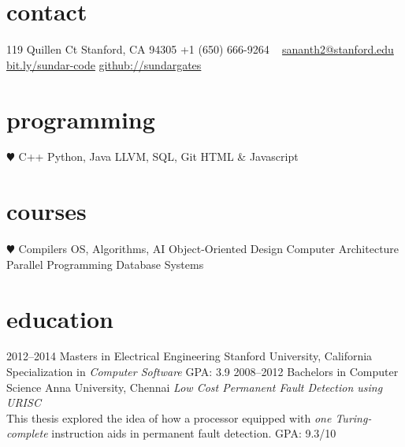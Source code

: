 \documentclass[]{friggeri-cv} %
\begin{document}


\begin{aside} %
\section{contact}
119 Quillen Ct
Stanford, CA 94305
+1 (650) 666-9264
~
\href{mailto:sananth2@stanford.edu}{sananth2@stanford.edu}
\href{http://bit.ly/topcoder-evernote}{bit.ly/sundar-code}
\href{https://github.com/sundargates}{github://sundargates}
\section{programming}
{\color{red} $\varheartsuit$} C++
Python, Java
LLVM, SQL, Git
HTML \& Javascript
~
\section{courses}
{\color{red} $\varheartsuit$} Compilers
OS, Algorithms, AI
Object-Oriented Design
Computer Architecture
Parallel Programming
Database Systems
\end{aside}


\section{education}

\begin{entrylist}
\entry
{2012--2014}
{Masters {\normalfont in Electrical Engineering}}
{Stanford University, California}
{Specialization in \emph{Computer Software} \textsf{GPA:} 3.9}
\entry
{2008--2012}
{Bachelors {\normalfont in Computer Science}}
{Anna University, Chennai}
{\emph{Low Cost Permanent Fault Detection using URISC} \\ This thesis explored the idea of how a processor equipped with \emph{one Turing-complete} instruction aids in permanent fault detection. \textsf{GPA:} 9.3/10}
\end{entrylist}
\end{document}
